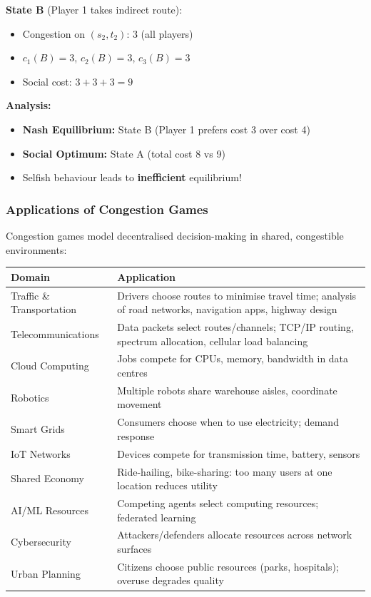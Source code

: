 \begin{exbox}
\textbf{State B} (Player 1 takes indirect route):
\begin{itemize}
  \item Congestion on $(s_2, t_2)$: 3 (all players)
  \item $c_1(B) = 3$, \quad $c_2(B) = 3$, \quad $c_3(B) = 3$
  \item Social cost: $3 + 3 + 3 = 9$
\end{itemize}

\textbf{Analysis:}
\begin{itemize}
  \item \textbf{Nash Equilibrium:} State B (Player 1 prefers cost 3 over cost 4)
  \item \textbf{Social Optimum:} State A (total cost 8 vs 9)
  \item Selfish behaviour leads to \textbf{inefficient} equilibrium!
\end{itemize}
\end{exbox}

\bigseparator

\subsubsection{Applications of Congestion Games}

Congestion games model decentralised decision-making in shared, congestible environments:

\begin{center}
\renewcommand{\arraystretch}{1.4}
\begin{tabular}{@{} l p{9cm} @{}}
\toprule
\textbf{Domain} & \textbf{Application} \\
\midrule
Traffic \& Transportation & Drivers choose routes to minimise travel time; analysis of road networks, navigation apps, highway design \\
Telecommunications & Data packets select routes/channels; TCP/IP routing, spectrum allocation, cellular load balancing \\
Cloud Computing & Jobs compete for CPUs, memory, bandwidth in data centres \\
Robotics & Multiple robots share warehouse aisles, coordinate movement \\
Smart Grids & Consumers choose when to use electricity; demand response \\
IoT Networks & Devices compete for transmission time, battery, sensors \\
Shared Economy & Ride-hailing, bike-sharing: too many users at one location reduces utility \\
AI/ML Resources & Competing agents select computing resources; federated learning \\
Cybersecurity & Attackers/defenders allocate resources across network surfaces \\
Urban Planning & Citizens choose public resources (parks, hospitals); overuse degrades quality \\
\bottomrule
\end{tabular}
\end{center}

